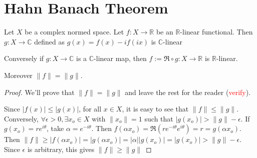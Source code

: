 
\section{Hahn Banach Theorem}
\begin{lemma}
  \label{lem:C_linear_map_from_R_linear}
  Let $X$ be a complex normed space. Let $f: X \to \mathbb{R}$ be an
  $\mathbb{R}$-linear functional. Then $g: X \to \mathbb{C}$ defined
  as $g(x) = f(x) - i f(ix)$ is $\mathbb{C}$-linear

  Conversely if $g: X \to \mathbb{C}$ is a $\mathbb{C}$-linear map,
  then $f:= \Re\circ g: X \to \mathbb{R}$ is $\mathbb{R}$-linear.

  Moreover $\|f\| = \|g\|$.
\end{lemma}
\begin{proof}
  We'll prove that $ \|f\| = \|g\|$ and leave the rest for the reader
  (\textcolor{red}{verify}).

  Since $|f(x)| \le |g(x)|$, for all $x \in X$, it is easy to see
  that $\|f\| \le \|g\|$. Conversely, $\forall \epsilon > 0, \exists
  x_o \in X$ with $\|x_o\| = 1$ such that $|g(x_o)| > \|g\| -
  \epsilon$. If $g(x_o)= re^{i\theta}$, take  $\alpha =
  e^{-i\theta}$. Then $f(\alpha x_o) = \Re(r e^{-i \theta}e^{ i
  \theta}) = r = g(\alpha x_o)$. Then $\|f\| \ge |f(\alpha x_o)| =
  |g(\alpha x_o)| = |\alpha||g(x_o)| = |g(x_o)| > \|g\| - \epsilon$.
  Since $\epsilon$ is arbitrary, this gives $\|f\| \ge \|g\|$
\end{proof}

